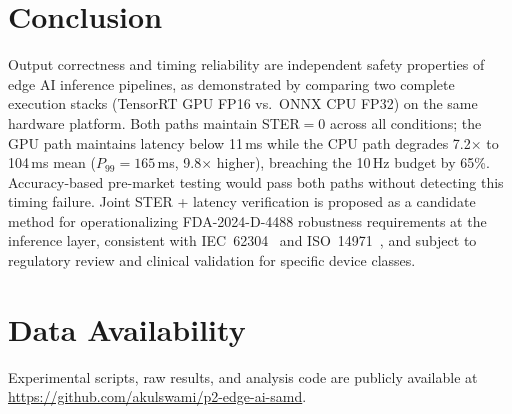 \documentclass[journal,twoside,9pt]{IEEEtran}
\begin{document}
\section{Conclusion}

Output correctness and timing reliability are independent safety properties of edge
AI inference pipelines, as demonstrated by comparing two complete execution stacks
(TensorRT GPU FP16 vs.\ ONNX CPU FP32) on the same hardware platform. Both paths maintain STER$=0$ across all conditions; the GPU
path maintains latency below 11\,ms while the CPU path degrades 7.2$\times$ to
104\,ms mean ($P_{99}=165$\,ms, 9.8$\times$ higher), breaching the 10\,Hz budget by
65\%. Accuracy-based pre-market testing would pass both paths without detecting this
timing failure. Joint STER + latency verification is proposed as a candidate method
for operationalizing FDA-2024-D-4488 robustness requirements at the inference layer,
consistent with IEC~62304~\cite{iec62304} and ISO~14971~\cite{iso14971}, and subject
to regulatory review and clinical validation for specific device classes.

\section*{Data Availability}
Experimental scripts, raw results, and analysis code are publicly available at
\url{https://github.com/akulswami/p2-edge-ai-samd}.
\end{document}

